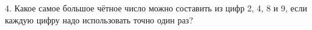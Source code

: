 4. Какое самое большое чётное число можно составить из цифр 2, 4, 8 и 9, если каждую цифру надо использовать точно один раз?\\
